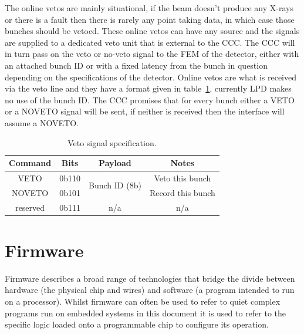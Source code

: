 The online vetos are mainly situational, if the beam doesn't produce any X-rays or there is a fault then there is rarely any point taking data, in which case those bunches should be vetoed. These online vetos can have any source and the signals are supplied to a dedicated veto unit that is external to the CCC. The CCC will in turn pass on the veto or no-veto signal to the FEM of the detector, either with an attached bunch ID or with a fixed latency from the bunch in question depending on the specifications of the detector. Online vetos are what is received via the veto line and they have a format given in table~\ref{tab:veto_spec}, currently LPD makes no use of the bunch ID. The CCC promises that for every bunch either a VETO or a NOVETO signal will be sent, if neither is received then the interface will assume a NOVETO.
\begin{table}[htbp]
  \begin{center}
  \begin{tabular}{c|c|c|c}
    Command & Bits   & Payload                        & Notes\\
    \hline
    VETO    & 0b110  & \multirow{2}{*}{Bunch ID (8b)} & Veto this bunch \\
    NOVETO  & 0b101  &                                & Record this bunch \\
    reserved& 0b111  & n/a                            & n/a \\
  \end{tabular}
  \end{center}
  \caption{Veto signal specification.}
  \label{tab:veto_spec}
\end{table}
\section{Firmware} %
\label{sec:firmware}
Firmware describes a broad range of technologies that bridge the divide between hardware (the physical chip and wires) and software (a program intended to run on a processor). Whilst firmware can often be used to refer to quiet complex programs run on embedded systems in this document it is used to refer to the specific logic loaded onto a programmable chip to configure its operation.

